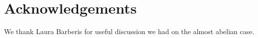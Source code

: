 \documentclass[a4paper,11pt]{amsart}
\theoremstyle{definition}
\newtheorem{example}[theorem]{Example}
\theoremstyle{remark}
\numberwithin{equation}{section}
\begin{document}

\section*{Acknowledgements}

We thank Laura Barberis for useful discussion we had on the almost abelian case. 
\end{document}
